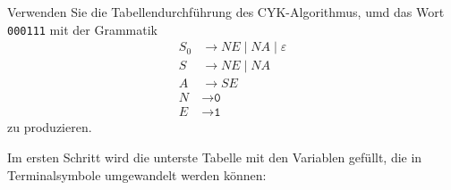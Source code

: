 Verwenden Sie die Tabellendurchführung des CYK-Algorithmus, umd
das Wort \texttt{000111} mit der Grammatik
\begin{align*}
S_0& \to NE \mid NA \mid \varepsilon \\
S  & \to NE \mid NA \\
A  &\to SE \\
N&\to \texttt{0} \\
E&\to \texttt{1} 
\end{align*}
zu produzieren.

\begin{loesung}
\def\h{1.0}
\def\punkt#1#2{({(#1)*\h},{(#2)*\h})}
\def\tabelle{
	\draw \punkt{0}{0} -- \punkt{6}{0};
	\foreach \x in {1,...,6}{
		\draw \punkt{0}{\x} -- \punkt{7-\x}{\x};
	}
	\draw \punkt{0}{0} -- \punkt{0}{6};
	\foreach \x in {1,...,6}{
		\draw \punkt{\x}{0} -- \punkt{\x}{7-\x};
	}
	\node at \punkt{0.5}{-0.5} {\texttt{0}};
	\node at \punkt{1.5}{-0.5} {\texttt{0}};
	\node at \punkt{2.5}{-0.5} {\texttt{0}};
	\node at \punkt{3.5}{-0.5} {\texttt{1}};
	\node at \punkt{4.5}{-0.5} {\texttt{1}};
	\node at \punkt{5.5}{-0.5} {\texttt{1}};
	\draw[decorate,decoration={calligraphic brace},thick]
		\punkt{6}{-1} -- \punkt{0}{-1};
	\node at \punkt{3}{-1.5} {$w$};
}
\def\terminal#1#2#3{
	\draw[->,color=red,line width=1.4pt,shorten >= 0.3cm,shorten <= 0.3cm]
		\punkt{#1-0.5}{#2-0.5} -- ++\punkt{0}{-1};
	\node at \punkt{#1-0.5}{#2-0.5}{#3};
}
\def\zeichen#1#2#3#4{
	\draw[->,color=red,line width=1.4pt,shorten >= 0.2cm,shorten <= 0.2cm]
		\punkt{#1-0.5}{#2-0.5} -- ++\punkt{0}{-#4};
	\draw[->,color=red,line width=1.4pt,shorten >= 0.28cm,shorten <= 0.28cm]
		\punkt{#1-0.5}{#2-0.5} -- ++\punkt{#2-#4}{#4-#2};
	\node at \punkt{#1-0.5}{#2-0.5}{#3};
}
\def\keinzeichen#1#2{
	\fill[color=gray!40] \punkt{#1}{#2}
		-- ++\punkt{-1}{0}
		-- ++\punkt{0}{-1}
		-- ++\punkt{1}{0} -- cycle;
}
\def\lineone{
	\terminal{1}{1}{$N$}
	\terminal{2}{1}{$N$}
	\terminal{3}{1}{$N$}
	\terminal{4}{1}{$E$}
	\terminal{5}{1}{$E$}
	\terminal{6}{1}{$E$}
}
\def\linetwo{
	\keinzeichen{1}{2}
	\keinzeichen{2}{2}
	\zeichen{3}{2}{$S_0,S$}{1}
	\keinzeichen{4}{2}
	\keinzeichen{5}{2}
}
\def\linethree{
	\keinzeichen{1}{3}
	\keinzeichen{2}{3}
	\zeichen{3}{3}{$A$}{1}
	\keinzeichen{4}{3}
}
\def\linefour{
	\keinzeichen{1}{4}
	\zeichen{2}{4}{$S_0,S$}{3}
	\keinzeichen{3}{4}
}
\def\linefive{
	\keinzeichen{1}{5}
	\zeichen{2}{5}{$A$}{1}
}
\def\linesix{
	\zeichen{1}{6}{$S_0,S$}{5}
}
Im ersten Schritt wird die unterste Tabelle mit den Variablen
gefüllt, die in Terminalsymbole umgewandelt werden können:
\begin{center}

\end{center}
\end{loesung}
